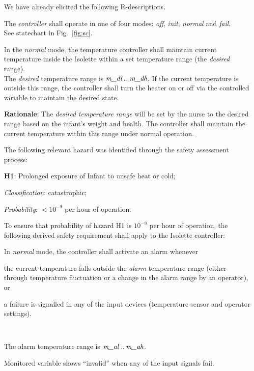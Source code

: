 \documentclass[fontsize=12pt,paper=letter,twoside]{scrartcl}
\begin{document}
We have already elicited the following R-descriptions.

\rdescription
{The \emph{controller} shall operate in one of four modes: \emph{off}, \emph{init}, \emph{normal} and \emph{fail}.\\}
{See statechart in Fig.~\ref{fig:sc}.}
\label{R1}

\rdescription
{In the \emph{normal} mode, the temperature controller shall maintain current temperature inside the Isolette within a set temperature range (the \emph{desired} range).\\}
{The \emph{desired} temperature range is $\textit{m\_dl} \mathbin{.\mkern1mu.} \textit{m\_dh}$. If the current temperature  is outside this range, the controller shall turn the heater on or off via the controlled variable  to maintain the desired state.\smallskip}
\label{R2}

\smallskip
\noindent \textbf{Rationale}: The \emph{desired temperature range} will be set by the nurse to the desired range based on the infant's weight and health. The controller shall maintain the current temperature within this range under normal operation.

The following relevant hazard was identified through the safety assessment process:
\begin{mylist}
\item \textbf{H1}: Prolonged exposure of Infant to unsafe heat or cold;
\item \emph{Classification}: catastrophic;
\item \emph{Probability}: $<10^{-9}$ per hour of operation.
\end{mylist}

\noindent To ensure that probability of hazard H1 is $10^{-9}$ per hour of operation, the following derived safety requirement shall apply to the Isolette controller: 

\rdescription
{In \emph{normal} mode, the controller shall activate an alarm whenever 

\begin{mylist}
\item the current temperature falls outside the \emph{alarm} temperature range (either through temperature fluctuation or a change in the alarm range by an operator), or
\item a failure is signalled in any of the input devices (temperature sensor and operator settings).
\end{mylist}~}
{The alarm temperature range is $\textit{m\_al}\mathbin{.\mkern1mu.}\textit{m\_ah}$.

Monitored variable  
shows ``invalid'' when any of the input signals fail.}
\label{R3}
\end{document}
